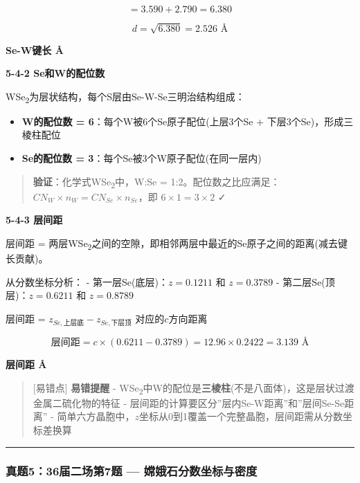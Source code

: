 \[= 3.590 + 2.790 = 6.380\]

\[d = \sqrt{6.380} = 2.526 \text{ Å}\]

\textbf{Se-W键长  Å}

\textbf{5-4-2 Se和W的配位数}

WSe\textsubscript{2}为层状结构，每个S层由Se-W-Se三明治结构组成：

\begin{itemize}
\tightlist
\item
  \textbf{W的配位数 = 6}：每个W被6个Se原子配位(上层3个Se + 下层3个Se)，形成三棱柱配位
\item
  \textbf{Se的配位数 = 3}：每个Se被3个W原子配位(在同一层内)
\end{itemize}

\begin{quote}
\textbf{验证}：化学式WSe\textsubscript{2}中，W:Se = 1:2。配位数之比应满足：\(CN_W \times n_W = CN_{Se} \times n_{Se}\)，即 \(6 \times 1 = 3 \times 2\) ✓
\end{quote}

\textbf{5-4-3 层间距}

层间距 = 两层WSe\textsubscript{2}之间的空隙，即相邻两层中最近的Se原子之间的距离(减去键长贡献)。

从分数坐标分析：
- 第一层Se(底层)：\(z = 0.1211\) 和 \(z = 0.3789\)
- 第二层Se(顶层)：\(z = 0.6211\) 和 \(z = 0.8789\)

层间距 = \(z_{Se,上层底} - z_{Se,下层顶}\) 对应的\(c\)方向距离

\[\text{层间距} = c \times (0.6211 - 0.3789) = 12.96 \times 0.2422 = 3.139 \text{ Å}\]

\textbf{层间距  Å}

\begin{quote}
{[}易错点{]} \textbf{易错提醒}
- WSe\textsubscript{2}中W的配位是\textbf{三棱柱}(不是八面体)，这是层状过渡金属二硫化物的特征
- 层间距的计算要区分''层内Se-W距离''和''层间Se-Se距离''
- 简单六方晶胞中，\(z\)坐标从0到1覆盖一个完整晶胞，层间距需从分数坐标差换算
\end{quote}

\begin{center}\rule{0.5\linewidth}{0.5pt}\end{center}

\subsubsection{真题5：36届二场第7题 --- 嫦娥石分数坐标与密度}\label{ux771fux9898536ux5c4aux4e8cux573aux7b2c7ux9898-ux5ae6ux5a25ux77f3ux5206ux6570ux5750ux6807ux4e0eux5bc6ux5ea6}

